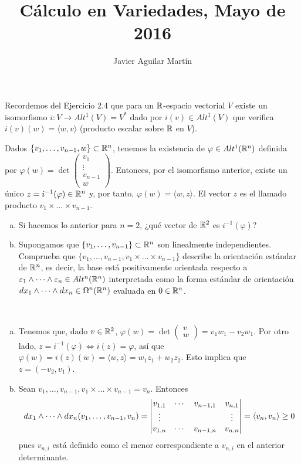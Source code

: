 \documentclass[twoside]{article}
\begin{document}
\title{Cálculo en Variedades, Mayo de 2016}
\author{Javier Aguilar Martín}
\maketitle


\begin{ejercicio}{1}
Recordemos del Ejercicio 2.4 que para un $\mathbb{R}$-espacio vectorial $V$ existe un isomorfismo $i:V\to Alt^1(V)=V^*$ dado por $i(v)\in Alt^1(V)$ que verifica $i(v)(w)=\langle w, v\rangle$ (producto escalar sobre $\mathbb{R}$ en $V$). 

Dados $\{v_1,\dots, v_{n-1},w\}\subset\mathbb{R}^n$, tenemos la existencia de $\varphi\in Alt^1(\mathbb{R}^n)$ definida por $\varphi(w)=\det\begin{pmatrix}
v_1\\
\vdots\\
v_{n-1}\\
w
\end{pmatrix}$. Entonces, por el isomorfismo anterior, existe un único $z=i^{-1}(\varphi)\in\mathbb{R}^n$ y, por tanto, $\varphi(w)=\langle w,z\rangle$. El vector $z$ es el llamado producto $v_1\times\dots\times v_{n-1}$.
\begin{enumerate}[a)]
\item Si hacemos lo anterior para $n=2$, ¿qué vector de $\mathbb{R}^2$ es $i^{-1}(\varphi)$?
\item Supongamos que $\{v_1,\dots, v_{n-1}\}\subset\mathbb{R}^n$ son linealmente independientes. Comprueba que $\{v_1,\dots, v_{n-1}, v_1\times\dots\times v_{n-1}\}$ describe la orientación estándar de $\mathbb{R}^n$, es decir, la base está positivamente orientada respecto a $\varepsilon_1\land\dots\land\varepsilon_n\in Alt^n(\mathbb{R}^n)$ interpretada como la forma estándar de orientación $dx_1\land\dots\land dx_n\in\Omega^n(\mathbb{R}^n)$ evaluada en $0\in\mathbb{R}^n$.
\end{enumerate}
\end{ejercicio}
\begin{solucion}\
\begin{enumerate}[a)]
\item  Tenemos que, dado $v\in\mathbb{R}^2$,  $\varphi(w)=\det\begin{pmatrix}
v\\
w
\end{pmatrix}=v_1w_1-v_2w_1$. Por otro lado, $z=i^{-1}(\varphi)\Leftrightarrow i(z)=\varphi$, así que $\varphi(w)=i(z)(w)=\langle w,z\rangle =w_1z_1+w_2z_2$. Esto implica que $z=(-v_2,v_1)$. 
\item Sean $v_1,\dots, v_{n-1}, v_1\times\dots\times v_{n-1}=v_n$. Entonces
\[
dx_1\land\dots\land dx_n(v_1,\dots, v_{n-1},v_n)=\begin{vmatrix}
v_{1,1} & \cdots & v_{n-1,1} & v_{n,1}\\
\vdots &       &           & \vdots\\
v_{1,n}&  \cdots & v_{n-1,n} & v_{n,n}
\end{vmatrix}=\langle{v_n,v_n}\rangle\geq 0
\]
pues $v_{n,i}$ está definido como el menor correspondiente a $v_{n,i}$ en el anterior determinante. 
\end{enumerate}

\end{solucion}
\end{document}
